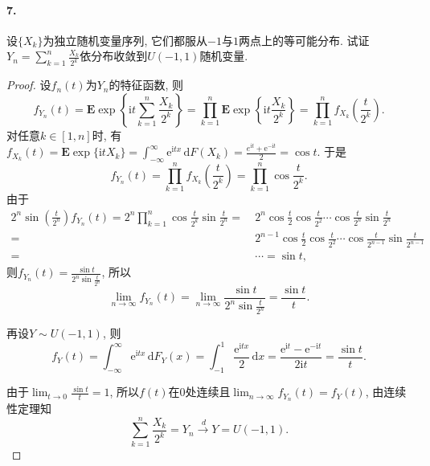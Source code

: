 \documentclass[12pt, a4paper, oneside]{ctexart}
\def\d{\mathrm{d}}          %
\def\e{\mathrm{e}}          %
\def\i{\mathrm{i}}          %
\def\dra{\xrightarrow{\ \ d\ }}     %
\def\E{\textbf{E}}      %
\begin{document}
\paragraph*{7.}设$\{X_k\}$为独立随机变量序列, 它们都服从$-1$与$1$两点上的等可能分布. 试证$Y_n=\sum_{k=1}^n\frac{X_k}{2^k}$依分布收敛到$U(-1,1)$随机变量.
\begin{proof}
    设$f_n(t)$为$Y_n$的特征函数, 则
    \begin{equation*}
        f_{Y_n}(t) = \E\exp\left\{\i t\sum_{k=1}^n\frac{X_k}{2^k}\right\} = \prod_{k=1}^n\E\exp\left\{\i t\frac{X_k}{2^k}\right\} = \prod_{k=1}^n f_{X_k}\left(\frac{t}{2^k}\right).
    \end{equation*}
    对任意$k\in[1, n]$时, 有$f_{X_k}(t) = \E\exp\{\i tX_k\} = \int_{-\infty}^{\infty}\e^{\i tx}\,\d F(X_k) = \frac{e^{\i t}+\e^{-\i t}}{2} = \cos t$. 于是
    \begin{equation*}
        f_{Y_n}(t) = \prod_{k=1}^nf_{X_k}\left(\frac{t}{2^k}\right) = \prod_{k=1}^n\cos \frac{t}{2^k}.
    \end{equation*}
    由于
    \begin{align*}
        2^n\sin\left(\frac{t}{2^n}\right)f_{Y_n}(t) = 2^n\prod_{k=1}^n\cos\frac{t}{2^k}\sin\frac{t}{2^n} =&\ 2^n\cos\frac{t}{2}\cos\frac{t}{2^2}\cdots\cos\frac{t}{2^n}\sin\frac{t}{2^n}\\
        =&\ 2^{n-1}\cos\frac{t}{2}\cos\frac{t}{2^2}\cdots\cos\frac{t}{2^{n-1}}\sin\frac{t}{2^{n-1}}\\
        =&\ \cdots=\sin t,
    \end{align*}
    则$f_{Y_n}(t) = \frac{\sin t}{2^n\sin\frac{t}{2^n}}$, 所以
    \begin{equation*}
        \lim_{n\to\infty}f_{Y_n}(t) = \lim_{n\to\infty}\frac{\sin t}{2^n\sin\frac{t}{2^n}} = \frac{\sin t}{t}.
    \end{equation*}

    再设$Y\sim U(-1,1)$, 则
    \begin{equation*}
        f_{Y}(t) = \int_{-\infty}^\infty \e^{\i tx}\,\d F_Y(x) = \int_{-1}^1\frac{\e^{\i tx}}{2}\,\d x = \frac{\e^{\i t}-\e^{-\i t}}{2\i t} = \frac{\sin t}{t}.
    \end{equation*}

    由于$\lim_{t\to 0}\frac{\sin t}{t} = 1$, 所以$f(t)$在$0$处连续且$\lim_{n\to\infty}f_{Y_n}(t) = f_Y(t)$, 由连续性定理知
    \begin{equation*}
        \sum_{k=1}^n\frac{X_k}{2^k}=Y_n\dra Y=U(-1,1).
    \end{equation*}
\end{proof}
\end{document}
